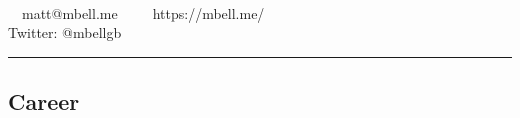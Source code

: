 \documentclass[11pt,a4paper]{article}
\begin{document}
\begin{center}
{\Huge {}}\\


\ \ matt@mbell.me\ \ \textbullet\
\ \ https://mbell.me/
\\
Twitter: @mbellgb
\end{center}


\hrule
\vspace{-1.2em}
\subsection*{Career}
\end{document}
